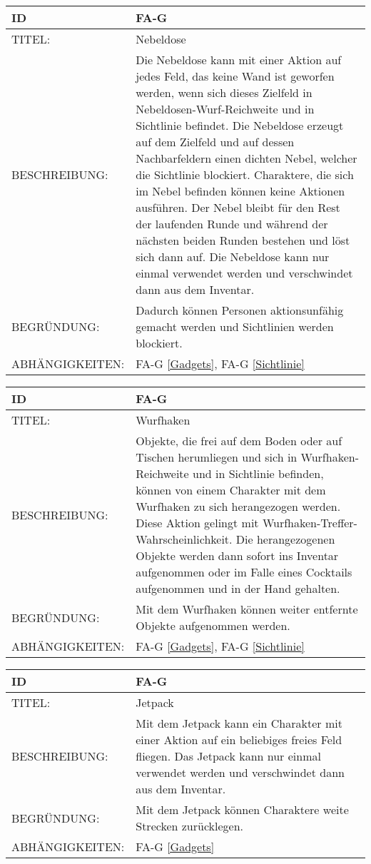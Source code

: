 \begin{tabularx}{16cm}{l|X}
	{table}\label{Nebeldose}
	\textbf{ID} & \textbf{FA-G \arabic{table}} \\
	\hline
	TITEL: & Nebeldose \\
	\hline
	BESCHREIBUNG: & Die Nebeldose kann mit einer Aktion auf jedes Feld, das keine Wand ist geworfen werden, wenn sich dieses Zielfeld in Nebeldosen-Wurf-Reichweite und in Sichtlinie befindet. Die Nebeldose erzeugt auf dem Zielfeld und auf dessen Nachbarfeldern einen dichten Nebel, welcher die Sichtlinie blockiert. Charaktere, die sich im Nebel befinden können keine Aktionen ausführen. Der Nebel bleibt für den Rest der laufenden Runde und während der nächsten beiden Runden bestehen und löst sich dann auf. Die Nebeldose kann nur einmal verwendet werden und verschwindet dann aus dem Inventar. \\
	\hline
	BEGRÜNDUNG: &  Dadurch können Personen aktionsunfähig gemacht werden und Sichtlinien werden blockiert. \\
	\hline
	ABHÄNGIGKEITEN: & FA-G \ref{Gadgets}, FA-G \ref{Sichtlinie} \\
\end{tabularx}

\begin{tabularx}{16cm}{l|X}
	{table}\label{Wurfhaken}
	\textbf{ID} & \textbf{FA-G \arabic{table}} \\
	\hline
	TITEL: & Wurfhaken \\
	\hline
	BESCHREIBUNG: & Objekte, die frei auf dem Boden oder auf Tischen herumliegen und sich in Wurfhaken-Reichweite und in Sichtlinie befinden, können von einem Charakter mit dem Wurfhaken zu sich herangezogen werden. Diese Aktion gelingt mit Wurfhaken-Treffer-Wahrscheinlichkeit. Die herangezogenen Objekte werden dann sofort ins Inventar aufgenommen oder im Falle eines Cocktails aufgenommen und in der Hand gehalten. \\
	\hline
	BEGRÜNDUNG: &  Mit dem Wurfhaken können weiter entfernte Objekte aufgenommen werden. \\
	\hline
	ABHÄNGIGKEITEN: & FA-G \ref{Gadgets}, FA-G \ref{Sichtlinie} \\
\end{tabularx}

\begin{tabularx}{16cm}{l|X}
	{table}\label{Jetpack}
	\textbf{ID} & \textbf{FA-G \arabic{table}} \\
	\hline
	TITEL: & Jetpack \\
	\hline
	BESCHREIBUNG: & Mit dem Jetpack kann ein Charakter mit einer Aktion auf ein beliebiges freies Feld fliegen. Das Jetpack kann nur einmal verwendet werden und verschwindet dann aus dem Inventar. \\
	\hline
	BEGRÜNDUNG: &  Mit dem Jetpack können Charaktere weite Strecken zurücklegen. \\
	\hline
	ABHÄNGIGKEITEN: & FA-G \ref{Gadgets} \\
\end{tabularx}

